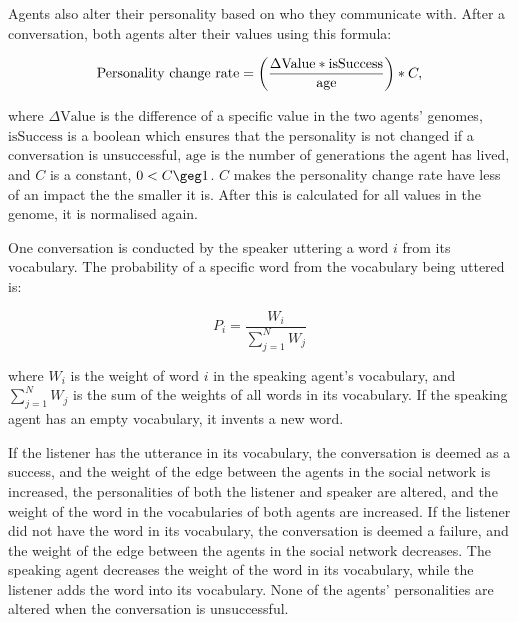Agents also alter their personality based on who they communicate with. After a conversation, both agents alter their values using this formula:

\begin{equation}\label{eq:PCR}
\text{Personality change rate} = \left( \frac{\Delta \text{Value} \ast \text{isSuccess}}{\text{age}} \right)\ast C,
\end{equation}

where $\Delta \text{Value}$ is the difference of a specific value in the two agents' genomes, $\text{isSuccess}$ is a boolean which ensures that the personality is not changed if a conversation is unsuccessful, $\text{age}$ is the number of generations the agent has lived, and $C$ is a constant, $0 < C \geg 1$. $C$ makes the personality change rate have less of an impact the the smaller it is. After this is calculated for all values in the genome, it is normalised again.

One conversation is conducted by the speaker uttering a word $i$ from its vocabulary. The probability of a specific word from the vocabulary being uttered is:

\begin{equation}\label{eq:chooseWordprob}
P_{i} = \frac{W_{i}}{\sum_{j=1}^{N}W_{j}}
\end{equation}

where $W_{i}$ is the weight of word $i$ in the speaking agent's vocabulary, and $\sum_{j=1}^{N}W_{j}$ is the sum of the weights of all words in its vocabulary. If the speaking agent has an empty vocabulary, it invents a new word. 

If the listener has the utterance in its vocabulary, the conversation is deemed as a success, and the weight of the edge between the agents in the social network is increased, the personalities of both the listener and speaker are altered, and the weight of the word in the vocabularies of both agents are increased. If the listener did not have the word in its vocabulary, the conversation is deemed a failure, and the weight of the edge between the agents in the social network decreases. The speaking agent decreases the weight of the word in its vocabulary, while the listener adds the word into its vocabulary. None of the agents' personalities are altered when the conversation is unsuccessful.

